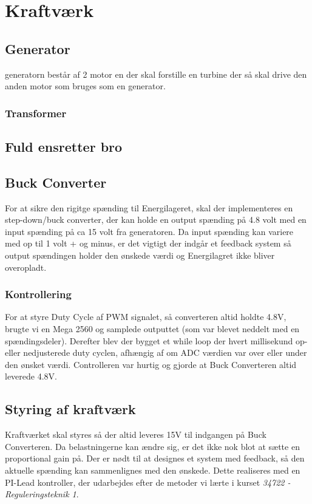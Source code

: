 \documentclass[../main.tex]{subfiles}
\begin{document}
\chapter{Kraftværk} \label{Chap:Kraftværk}

\section{Generator}
generatorn består af 2 motor en der skal forstille en turbine der så skal drive den anden motor som bruges som en generator.
\subsection{Transformer}
\section{Fuld ensretter bro}

\section{Buck Converter}
For at sikre den rigitge spænding til Energilageret, skal der implementeres en step-down/buck converter, der kan holde en output spænding på 4.8 volt med en input spænding på ca 15 volt fra generatoren. Da input spænding kan variere med op til 1 volt + og minus, er det vigtigt der indgår et feedback system så output spændingen holder den ønskede værdi og Energilagret ikke bliver overopladt.

\subsection{Kontrollering}
For at styre Duty Cycle af PWM signalet, så converteren altid holdte 4.8V, brugte vi en Mega 2560 og samplede outputtet (som var blevet neddelt med en spændingsdeler). Derefter blev der bygget et while loop der hvert millisekund op- eller nedjusterede duty cyclen, afhængig af om ADC værdien var over eller under den ønsket værdi. Controlleren var hurtig og gjorde at Buck Converteren altid leverede 4.8V. 

\section{Styring af kraftværk}
Kraftværket skal styres så der altid leveres 15V til indgangen på Buck Converteren. Da belastningerne kan ændre sig, er det ikke nok blot at sætte en proportional gain på. Der er nødt til at designes et system med feedback, så den aktuelle spænding kan sammenlignes med den ønskede. Dette realiseres med en PI-Lead kontroller, der udarbejdes efter de metoder vi lærte i kurset \emph{34722 - Reguleringsteknik 1}.
\end{document}
